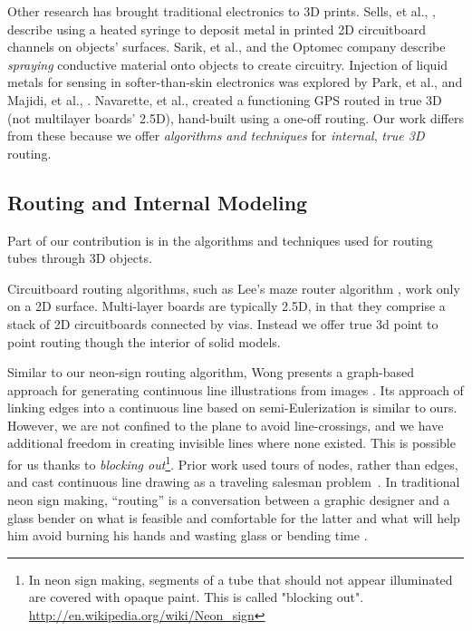 Other research has brought traditional electronics to 3D prints.  Sells, et al., \cite{Sells-reprap}, describe using a heated syringe to deposit metal in printed 2D circuitboard channels on objects' surfaces.  Sarik, et al., \cite{Sarik-tracebrush}  and the Optomec company \cite{optomec} describe \emph{spraying} conductive material onto objects to create circuitry.  Injection of liquid metals for sensing in softer-than-skin electronics was explored by Park, et al., \cite{Park-microchannels} and Majidi, et al., \cite{Majidi-curvature}.  Navarette, et al., created a functioning GPS routed in true 3D (not multilayer boards' 2.5D), hand-built using a one-off routing.  Our work differs from these because we offer \emph{algorithms and techniques} for \emph{internal}, \emph{true 3D} routing.

\subsection{Routing and Internal Modeling}

Part of our contribution is in the algorithms and techniques used for routing tubes through 3D objects.

Circuitboard routing algorithms, such as Lee's maze router algorithm \cite{Lee-maze}, work only on a 2D surface. Multi-layer boards are typically 2.5D, in that they comprise a stack of 2D circuitboards connected by vias.  Instead we offer true 3d point to point routing though the interior of solid models.

Similar to our neon-sign routing algorithm, Wong presents a graph-based approach for generating continuous line illustrations from images \cite{Wong-continuousline}. Its approach of linking edges into a continuous line based on semi-Eulerization is similar to ours.  However, we are not confined to the plane to avoid line-crossings, and we have additional freedom in creating invisible lines where none existed.  This is possible for us thanks to \emph{blocking out}\footnote{In neon sign making, segments of a tube that should not appear illuminated are covered with opaque paint. This is called "blocking out". \url{http://en.wikipedia.org/wiki/Neon_sign}}. Prior work used tours of nodes, rather than edges, and cast continuous line drawing as a traveling salesman problem~\cite{Bosch-tsp}. In traditional neon sign making, ``routing'' is a conversation between a graphic designer and a glass bender on what is feasible and comfortable for the latter and what will help him avoid burning his hands and wasting glass or bending time \cite{strattman1997neon}.

